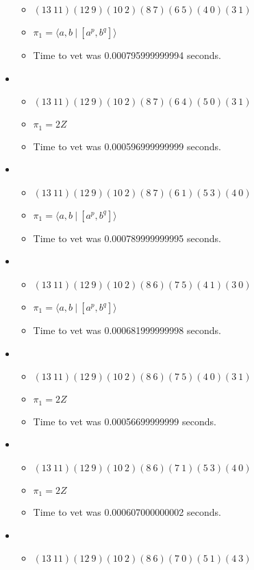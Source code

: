 \documentclass{article}
\begin{document}
\begin{itemize}
\begin{itemize}
      \item $(13\ 11)(12\ 9)(10\ 2)(8\ 7)(6\ 5)(4\ 0)(3\ 1)$
      \item $\pi_1 = \langle a,b\ |\ [a^p,b^q]\rangle$
      \item Time to vet was 0.000795999999994 seconds.
\end{itemize}
\item \begin{itemize}
      \item $(13\ 11)(12\ 9)(10\ 2)(8\ 7)(6\ 4)(5\ 0)(3\ 1)$
      \item $\pi_1 =2 Z$
      \item Time to vet was 0.000596999999999 seconds.
\end{itemize}
\item \begin{itemize}
      \item $(13\ 11)(12\ 9)(10\ 2)(8\ 7)(6\ 1)(5\ 3)(4\ 0)$
      \item $\pi_1 = \langle a,b\ |\ [a^p,b^q]\rangle$
      \item Time to vet was 0.000789999999995 seconds.
\end{itemize}
\item \begin{itemize}
      \item $(13\ 11)(12\ 9)(10\ 2)(8\ 6)(7\ 5)(4\ 1)(3\ 0)$
      \item $\pi_1 = \langle a,b\ |\ [a^p,b^q]\rangle$
      \item Time to vet was 0.000681999999998 seconds.
\end{itemize}
\item \begin{itemize}
      \item $(13\ 11)(12\ 9)(10\ 2)(8\ 6)(7\ 5)(4\ 0)(3\ 1)$
      \item $\pi_1 =2 Z$
      \item Time to vet was 0.00056699999999 seconds.
\end{itemize}
\item \begin{itemize}
      \item $(13\ 11)(12\ 9)(10\ 2)(8\ 6)(7\ 1)(5\ 3)(4\ 0)$
      \item $\pi_1 =2 Z$
      \item Time to vet was 0.000607000000002 seconds.
\end{itemize}
\item \begin{itemize}
      \item $(13\ 11)(12\ 9)(10\ 2)(8\ 6)(7\ 0)(5\ 1)(4\ 3)$

\end{itemize}
\end{itemize}
\end{document}
